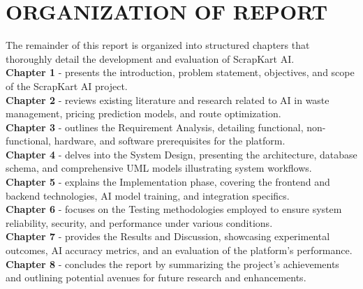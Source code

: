 \section{ORGANIZATION OF REPORT}
The remainder of this report is organized into structured chapters that thoroughly detail the development and evaluation of ScrapKart AI.\\
\textbf{Chapter 1} - presents the introduction, problem statement, objectives, and scope of the ScrapKart AI project.\\
\textbf{Chapter 2} - reviews existing literature and research related to AI in waste management, pricing prediction models, and route optimization.\\
\textbf{Chapter 3} - outlines the Requirement Analysis, detailing functional, non-functional, hardware, and software prerequisites for the platform.\\
\textbf{Chapter 4} - delves into the System Design, presenting the architecture, database schema, and comprehensive UML models illustrating system workflows.\\
\textbf{Chapter 5} - explains the Implementation phase, covering the frontend and backend technologies, AI model training, and integration specifics.\\
\textbf{Chapter 6} - focuses on the Testing methodologies employed to ensure system reliability, security, and performance under various conditions.\\
\textbf{Chapter 7} - provides the Results and Discussion, showcasing experimental outcomes, AI accuracy metrics, and an evaluation of the platform's performance.\\
\textbf{Chapter 8} - concludes the report by summarizing the project's achievements and outlining potential avenues for future research and enhancements.
